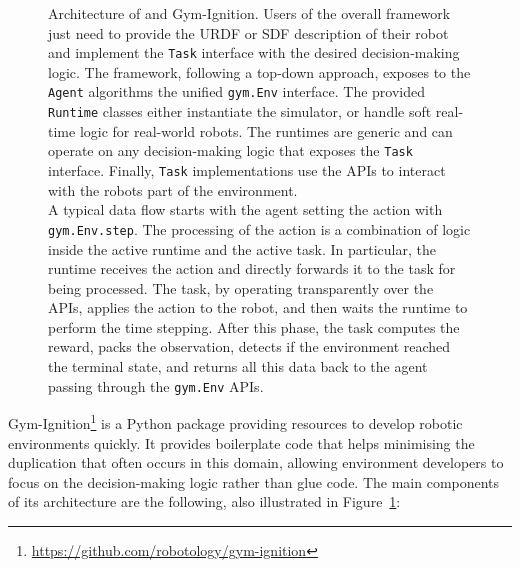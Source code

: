 \begin{figure}
    \centering
    \caption{Architecture of \scenario and Gym-Ignition. Users of the overall framework just need to provide the \acs{URDF} or \acs{SDF} description of their robot and implement the \texttt{Task} interface with the desired decision-making logic. The framework, following a top-down approach, exposes to the \texttt{Agent} algorithms the unified \texttt{gym.Env} interface. The provided \texttt{Runtime} classes either instantiate the simulator, or handle soft real-time logic for real-world robots. The runtimes are generic and can operate on any decision-making logic that exposes the \texttt{Task} interface. Finally, \texttt{Task} implementations use the \scenario \acp{API} to interact with the robots part of the environment.\\
    A typical data flow starts with the agent setting the action with \texttt{gym.Env.step}. The processing of the action is a combination of logic inside the active runtime and the active task. In particular, the runtime receives the action and directly forwards it to the task for being processed. The task, by operating transparently over the \scenario \acp{API}, applies the action to the robot, and then waits the runtime to perform the time stepping. After this phase, the task computes the reward, packs the observation, detects if the environment reached the terminal state, and returns all this data back to the agent passing through the \texttt{gym.Env} \acp{API}.}
    \label{fig:scenario_and_gym_ignition}
\end{figure}

Gym-Ignition\footnote{\url{https://github.com/robotology/gym-ignition}} is a Python package providing resources to develop robotic environments quickly.
It provides boilerplate code that helps minimising the duplication that often occurs in this domain, allowing environment developers to focus on the decision-making logic rather than glue code.
The main components of its architecture are the following, also illustrated in Figure~\ref{fig:scenario_and_gym_ignition}: 

